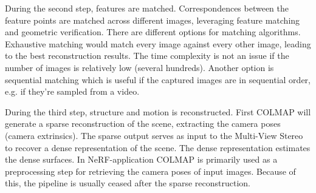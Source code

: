 During the second step, features are matched. Correspondences between the feature points are matched across different images, leveraging feature matching and geometric verification. There are different options for matching algorithms. Exhaustive matching would match every image against every other image, leading to the best reconstruction results. The time complexity is not an issue if the number of images is relatively low (several hundreds). Another option is sequential matching which is useful if the captured images are in sequential order, e.g. if they're sampled from a video.

During the third step, structure and motion is reconstructed. First COLMAP will generate a sparse reconstruction of the scene, extracting the camera poses (camera extrinsics). The sparse output serves as input to the Multi-View Stereo to recover a dense representation of the scene. The dense representation estimates the dense surfaces. In NeRF-application COLMAP is primarily used as a preprocessing step for retrieving the camera poses of input images. Because of this, the pipeline is usually ceased after the sparse reconstruction.



\begin{comment}
Exhaustive matching:
time complexity: O(n^2), where n is the number of images
memory complexity: O(n) for storing all images, O(n^2) for storing the results of the matching process

Sequential matching:
time complexity: O(n * k), where n is the number of images and k is the number of adjacent images each image is matched against
memory complexity: O(n * k)

Vocabulary tree-based matching:
time complexity: O(n^2), assuming that the size of the vocabulary tree is constant and not a function of the number n of images
memory complexity: O(n * k), where k is the number of top-retrieved images that each image is matched against
There is definitively literature on the topic of the time and memory complexity of vocabulary tree-based matching and image retrieval
\end{comment}


